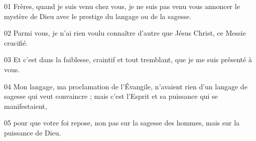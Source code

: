 01 Frères, quand je suis venu chez vous, je ne suis pas venu vous annoncer le mystère de Dieu avec le prestige du langage ou de la sagesse.

02 Parmi vous, je n’ai rien voulu connaître d’autre que Jésus Christ, ce Messie crucifié.

03 Et c’est dans la faiblesse, craintif et tout tremblant, que je me suis présenté à vous.

04 Mon langage, ma proclamation de l’Évangile, n’avaient rien d’un langage de sagesse qui veut convaincre ; mais c’est l’Esprit et sa puissance qui se manifestaient,

05 pour que votre foi repose, non pas sur la sagesse des hommes, mais sur la puissance de Dieu.
